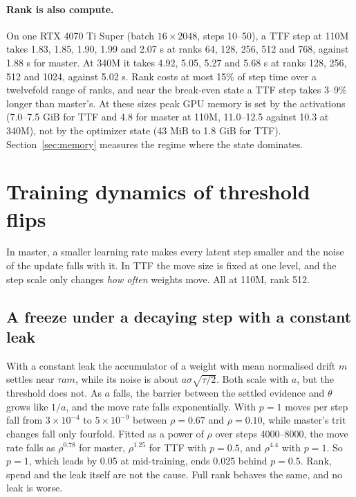 \documentclass[10pt,twocolumn]{article}
\begin{document}
\paragraph{Rank is also compute.} On one RTX 4070 Ti Super (batch $16\times2048$, steps 10--50), a TTF step at 110M
takes 1.83, 1.85, 1.90, 1.99 and 2.07 s at ranks 64, 128, 256, 512 and 768, against 1.88 s for master. At 340M it takes
4.92, 5.05, 5.27 and 5.68 s at ranks 128, 256, 512 and 1024, against 5.02 s. Rank costs at most 15\% of step time over
a twelvefold range of ranks, and near the break-even state a TTF step takes 3--9\% longer than master's. At these sizes
peak GPU memory is set by the activations (7.0--7.5 GiB for TTF and 4.8 for master at 110M, 11.0--12.5 against
10.3 at 340M), not by the optimizer state (43 MiB to 1.8 GiB for TTF). Section~\ref{sec:memory} measures the regime where the
state dominates.

\section{Training dynamics of threshold flips}\label{sec:dynamics}

In master, a smaller learning rate makes every latent step smaller and the noise of the update falls with it. In TTF the
move size is fixed at one level, and the step scale only changes \emph{how often} weights move. All at 110M, rank 512.

\subsection{A freeze under a decaying step with a constant leak}
With a constant leak the accumulator of a weight with mean normalised drift $m$ settles near $\tau a m$, while its noise
is about $a\sigma\sqrt{\tau/2}$. Both scale with $a$, but the threshold does not. As $a$ falls, the barrier between the
settled evidence and $\theta$ grows like $1/a$, and the move rate falls exponentially. With $p=1$ moves per step fall from
$3\times10^{-4}$ to $5\times10^{-9}$ between $\rho=0.67$ and $\rho=0.10$, while master's trit changes fall only
fourfold. Fitted as a power of $\rho$ over steps 4000--8000, the move rate falls as $\rho^{0.78}$ for master,
$\rho^{1.25}$ for TTF with $p=0.5$, and $\rho^{4.4}$ with $p=1$. So $p=1$, which leads by 0.05 at mid-training, ends
0.025 behind $p=0.5$. Rank, spend and the leak itself are not the cause. Full rank behaves the same, and no leak is
worse.
\end{document}
